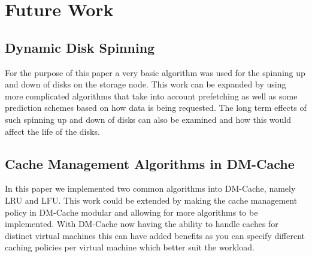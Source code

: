 \section{Future Work}
\label{sec:future}

\subsection{Dynamic Disk Spinning}

For the purpose of this paper a very basic algorithm was used for the spinning
up and down of disks on the storage node. This work can be expanded by using
more complicated algorithms that take into account prefetching as well as some
prediction schemes based on how data is being requested. The long term effects
of such spinning up and down of disks can also be examined and how this would
affect the life of the disks.

\subsection{Cache Management Algorithms in DM-Cache}

In this paper we implemented two common algorithms into DM-Cache, namely LRU and
LFU. This work could be extended by making the cache management policy in
DM-Cache modular and allowing for more algorithms to be implemented. With
DM-Cache now having the ability to handle caches for distinct virtual machines
this can have added benefits as you can specify different caching policies per
virtual machine which better suit the workload.
